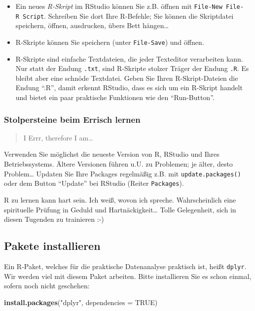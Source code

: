 \documentclass[12pt,ngerman,]{book}
\makeatletter
\newenvironment{Shaded}{\begin{snugshade}}{\end{snugshade}}
\newcommand{\KeywordTok}[1]{\textcolor[rgb]{0.13,0.29,0.53}{\textbf{{#1}}}}
\newcommand{\DataTypeTok}[1]{\textcolor[rgb]{0.13,0.29,0.53}{{#1}}}
\newcommand{\StringTok}[1]{\textcolor[rgb]{0.31,0.60,0.02}{{#1}}}
\newcommand{\OtherTok}[1]{\textcolor[rgb]{0.56,0.35,0.01}{{#1}}}
\newcommand{\NormalTok}[1]{{#1}}
\newenvironment{kframe}{%
\medskip{}
\setlength{\fboxsep}{.8em}
 \def\at@end@of@kframe{}%
 \ifinner\ifhmode%
  \def\at@end@of@kframe{\end{minipage}}%
  \begin{minipage}{\columnwidth}%
 \fi\fi%
 \def\FrameCommand##1{\hskip\@totalleftmargin \hskip-\fboxsep
 \colorbox{shadecolor}{##1}\hskip-\fboxsep
     \hskip-\linewidth \hskip-\@totalleftmargin \hskip\columnwidth}%
 \MakeFramed {\advance\hsize-\width
   \@totalleftmargin\z@ \linewidth\hsize
   \@setminipage}}%
 {\par\unskip\endMakeFramed%
 \at@end@of@kframe}
\renewenvironment{Shaded}{\begin{kframe}}{\end{kframe}}
\makeatother
\begin{document}
\begin{itemize}
\item
  Ein neues \emph{R-Skript} im RStudio können Sie z.B.
  öffnen mit \texttt{File-New\ File-R\ Script}. Schreiben Sie dort Ihre
  R-Befehle; Sie können die Skriptdatei speichern, öffnen, ausdrucken,
  übers Bett hängen\ldots{}
\item
  R-Skripte können Sie speichern (unter \texttt{File-Save}) und öffnen.
\item
  R-Skripte sind einfache Textdateien, die jeder Texteditor verarbeiten
  kann. Nur statt der Endung \texttt{.txt}, sind R-Skripte stolzer
  Träger der Endung \texttt{.R}. Es bleibt aber eine schnöde Textdatei.
  Geben Sie Ihren R-Skript-Dateien die Endung ``.R'', damit erkennt
  RStudio, dass es sich um ein R-Skript handelt und bietet ein paar
  praktische Funktionen wie den ``Run-Button''.
\end{itemize}

\subsubsection{Stolpersteine beim Errisch
lernen}\label{stolpersteine-beim-errisch-lernen}

\begin{quote}
I Errr, therefore I am\ldots{}
\end{quote}

Verwenden Sie möglichst die neueste Version von R, RStudio und Ihres
Betriebssystems. Ältere Versionen führen u.U. zu Problemen; je älter,
desto Problem\ldots{} Updaten Sie Ihre Packages regelmäßig z.B. mit
\texttt{update.packages()} oder dem Button ``Update'' bei RStudio
(Reiter \texttt{Packages}).

R zu lernen kann hart sein. Ich weiß, wovon ich spreche. Wahrscheinlich
eine spirituelle Prüfung in Geduld und Hartnäckigkeit\ldots{} Tolle
Gelegenheit, sich in diesen Tugenden zu trainieren :-)

\subsection{Pakete installieren}\label{pakete-installieren}

Ein R-Paket, welches für die praktische Datenanalyse praktisch ist,
heißt \texttt{dplyr}. Wir werden viel mit diesem Paket arbeiten. Bitte
installieren Sie es schon einmal, sofern noch nicht geschehen:

\begin{Shaded}
\begin{Highlighting}[]
\KeywordTok{install.packages}\NormalTok{(}\StringTok{"dplyr"}\NormalTok{, }\DataTypeTok{dependencies =} \OtherTok{TRUE}\NormalTok{) }
\end{Highlighting}
\end{Shaded}
\end{document}

